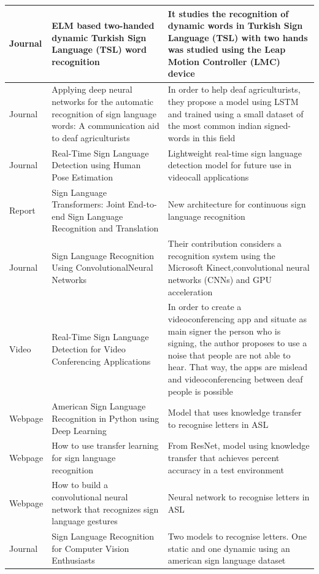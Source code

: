 \begin{longtable}{|p{3cm}|p{4cm}|p{6cm}|}
    \hline Journal & ELM based two-handed dynamic Turkish Sign Language (TSL) word recognition \cite{ELM2021} & It studies the recognition of dynamic words in Turkish Sign Language (TSL) with two hands was studied using the Leap Motion Controller (LMC) device \\
    \hline Journal & Applying deep neural networks for the automatic recognition of sign language words: A communication aid to deaf agriculturists \cite{Venugopalan2021} & In order to help deaf agriculturists, they propose a model using LSTM and trained using a small dataset of the most common indian signed-words in this field \\
    \hline Journal & Real-Time Sign Language Detection using Human Pose Estimation \cite{Moryossef2020} & Lightweight real-time sign language detection model for future use in videocall applications \\
    \hline Report  & Sign Language Transformers: Joint End-to-end Sign Language Recognition and Translation \cite{SignLanguageTransformers} & New architecture for continuous sign language recognition \\
    \hline Journal & Sign Language Recognition Using ConvolutionalNeural Networks \cite{Bronstein2015} & Their contribution considers a recognition system using the Microsoft Kinect,convolutional neural networks (CNNs) and GPU acceleration \\
    \hline Video   & Real-Time Sign Language Detection for Video Conferencing Applications \cite{RT2021} & In order to create a videoconferencing app and situate as main signer the person who is signing, the author proposes to use a noise that people are not able to hear. That way, the apps are mislead and videoconferencing between deaf people is possible \\
    \hline Webpage & American Sign Language Recognition in Python using Deep Learning \cite{ASLRecognitionPython} & Model that uses knowledge transfer to recognise letters in ASL \\
    \hline Webpage & How to use transfer learning for sign language recognition \cite{Vagdevi2019} & From ResNet, model using knowledge transfer that achieves  percent accuracy in a test environment \\ 
    \hline Webpage & How to build a convolutional neural network that recognizes sign language gestures \cite{Vagdevi2019i} & Neural network to recognise letters in ASL \\
    \hline Journal & Sign Language Recognition for Computer Vision Enthusiasts \cite{Vaishshells2021} & Two models to recognise letters. One static and one dynamic using an american sign language dataset \\

\end{longtable}
